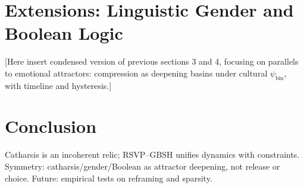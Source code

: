 \documentclass[11pt]{article}
\theoremstyle{plain}
\begin{document}
\section{Extensions: Linguistic Gender and Boolean Logic}

[Here insert condensed version of previous sections 3 and 4, focusing on parallels to emotional attractors: compression as deepening basins under cultural \(\psi_{\text{bin}}\), with timeline and hysteresis.]

\section{Conclusion}

Catharsis is an incoherent relic; RSVP–GBSH unifies dynamics with constraints. Symmetry: catharsis/gender/Boolean as attractor deepening, not release or choice. Future: empirical tests on reframing and sparsity.

\newpage	


\end{document}
